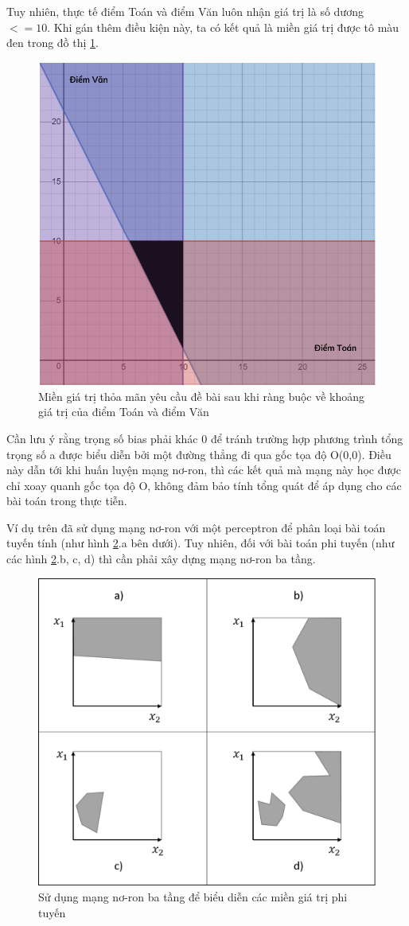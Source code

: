 \begin{answ}
Tuy nhiên, thực tế điểm Toán và điểm Văn luôn nhận giá trị là số dương \(<= 10\). Khi gán thêm điều kiện này, ta có kết quả là miền giá trị được tô màu đen trong đồ thị \ref{fig:example3-miengiatri2}.

\begin{figure}[h!]
	\centering
		\includegraphics[width=0.55\columnwidth]{chapter01/figure/example 3 - graph 2.PNG}
        \caption{Miền giá trị thỏa mãn yêu cầu đề bài sau khi ràng buộc về khoảng giá trị của điểm Toán và điểm Văn}
        \label{fig:example3-miengiatri2}
		\centering
\end{figure}

Cần lưu ý rằng trọng số bias phải khác 0 để tránh trường hợp phương trình tổng trọng số a được biểu diễn bởi một đường thẳng đi qua gốc tọa độ O(0,0). Điều này dẫn tới khi huấn luyện mạng nơ-ron, thì các kết quả mà mạng này học được chỉ xoay quanh gốc tọa độ O, không đảm bảo tính tổng quát để áp dụng cho các bài toán trong thực tiễn.
\end{answ}
Ví dụ trên đã sử dụng mạng nơ-ron với một perceptron để phân loại bài toán tuyến tính (như hình \ref{fig:neuronRegion}.a bên dưới). Tuy nhiên, đối với bài toán phi tuyến (như các hình \ref{fig:neuronRegion}.b, c, d) thì cần phải xây dựng mạng nơ-ron ba tầng.

\begin{figure}[!h]
	\centering
		\includegraphics[width=0.6\columnwidth]{chapter01/figure/Picture4.png}
    	\caption{Sử dụng mạng nơ-ron ba tầng để biểu diễn các miền giá trị phi tuyến}
	\centering
	\label{fig:neuronRegion}
\end{figure}

